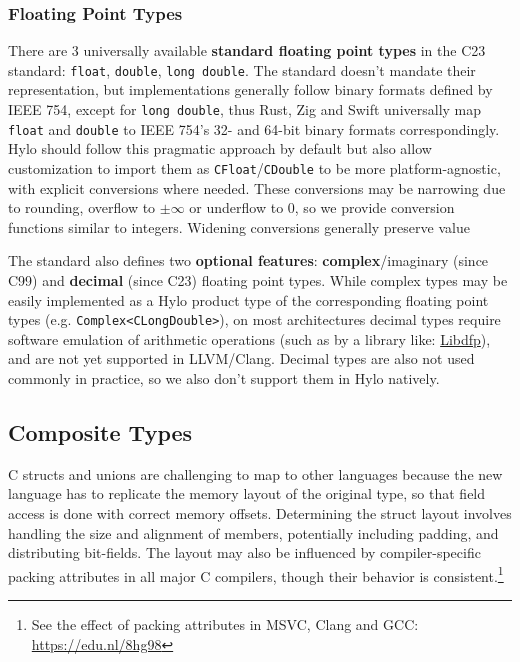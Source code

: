 \subsubsection{Floating Point Types}
There are 3 universally available \textbf{standard floating point types} in the C23 standard: \texttt{float}, \texttt{double}, \texttt{long double}. The standard doesn't mandate their representation, but implementations generally follow\cite{llvm-float-support} binary formats defined by IEEE 754\cite{ieee754}, except for \texttt{long double}\cite{longdouble-wiki}\cite{weird-precision-support}, thus Rust, Zig and Swift universally map \texttt{float} and \texttt{double} to IEEE 754's 32- and 64-bit binary formats correspondingly. Hylo should follow this pragmatic approach by default but also allow customization to import them as \texttt{CFloat}/\texttt{CDouble} to be more platform-agnostic, with explicit conversions where needed. These conversions may be narrowing due to rounding, overflow to $\pm\infty$ or underflow to 0, so we provide conversion functions similar to integers. Widening conversions generally preserve value

The standard also defines two \textbf{optional features}: \textbf{complex}/imaginary (since C99) and \textbf{decimal} (since C23) floating point types. While complex types may be easily implemented as a Hylo product type of the corresponding floating point types (e.g. \texttt{Complex<CLongDouble>}), on most architectures decimal types require software emulation of arithmetic operations (such as by a library like: \href{https://github.com/libdfp/libdfp}{Libdfp}), and are not yet supported in LLVM/Clang\cite{no-support-llvm-decimals}. Decimal types are also not used commonly in practice, so we also don't support them in Hylo natively.

\subsection{Composite Types}

C structs and unions are challenging to map to other languages because the new language has to replicate the memory layout of the original type, so that field access is done with correct memory offsets. Determining the struct layout involves handling the size and alignment of members, potentially including padding, and distributing bit-fields. The layout may also be influenced by compiler-specific packing attributes in all major C compilers, though their behavior is consistent.\footnote{See the effect of packing attributes in MSVC, Clang and GCC: \url{https://edu.nl/8hg98}}

